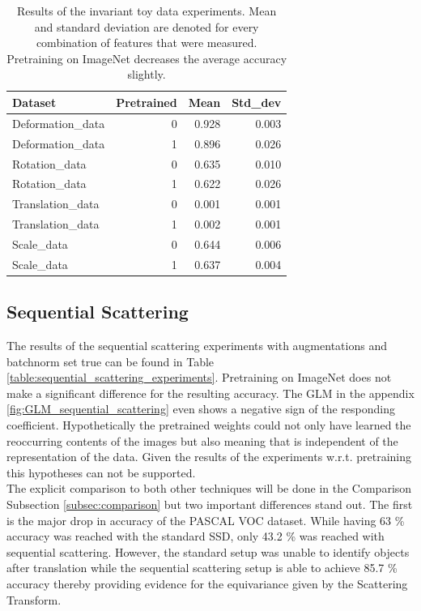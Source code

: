 \begin{table}[!htb]
	\centering
	\caption{Results of the invariant toy data experiments. Mean and standard deviation are denoted for every combination of features that were measured. Pretraining on ImageNet decreases the average accuracy slightly.}
	\begin{tabular}{lrrr}
		\toprule
		Dataset &  Pretrained &   Mean &  Std\_dev \\
		\midrule
		Deformation\_data &           0 &  0.928 &    0.003 \\
		Deformation\_data &           1 &  0.896 &    0.026 \\\hdashline
		Rotation\_data &           0 &  0.635 &    0.010 \\
		Rotation\_data &           1 &  0.622 &    0.026 \\\hdashline
		Translation\_data &           0 &  0.001 &    0.001 \\
		Translation\_data &           1 &  0.002 &    0.001 \\\hdashline
		Scale\_data &           0 &  0.644 &    0.006 \\
		Scale\_data &           1 &  0.637 &    0.004 \\
		\bottomrule
	\end{tabular}
	\label{table:invariant_data}
\end{table}

\subsection{Sequential Scattering}
\label{subsec:sequential_scattering_results}

The results of the sequential scattering experiments with augmentations and batchnorm set true can be found in Table \ref{table:sequential_scattering_experiments}. Pretraining on ImageNet does not make a significant difference for the resulting accuracy. The GLM in the appendix \ref{fig:GLM_sequential_scattering} even shows a negative sign of the responding coefficient. Hypothetically the pretrained weights could not only have learned the reoccurring contents of the images but also meaning that is independent of the representation of the data. Given the results of the experiments w.r.t. pretraining this hypotheses can not be supported. \\
The explicit comparison to both other techniques will be done in the Comparison Subsection \ref{subsec:comparison} but two important differences stand out. The first is the major drop in accuracy of the PASCAL VOC dataset. While having 63 \% accuracy was reached with the standard SSD, only 43.2 \% was reached with sequential scattering. However, the standard setup was unable to identify objects after translation while the sequential scattering setup is able to achieve 85.7 \% accuracy thereby providing evidence for the equivariance given by the Scattering Transform. 

